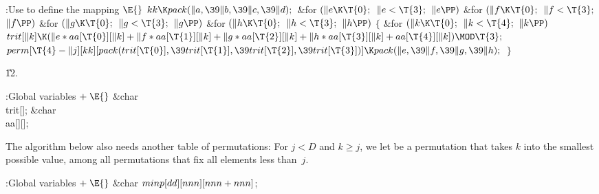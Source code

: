 \B{}:Use  to define the mapping \X${}\E{}$\6
$\\{kk}\K\\{pack}(\|a,\39\|b,\39\|c,\39\|d);{}$\6
\&{for} ${}(\|e\K\T{0};{}$ ${}\|e<\T{3};{}$ ${}\|e\PP){}$\1\6
\&{for} ${}(\|f\K\T{0};{}$ ${}\|f<\T{3};{}$ ${}\|f\PP){}$\1\6
\&{for} ${}(\|g\K\T{0};{}$ ${}\|g<\T{3};{}$ ${}\|g\PP){}$\1\6
\&{for} ${}(\|h\K\T{0};{}$ ${}\|h<\T{3};{}$ ${}\|h\PP){}$\5
${}\{{}$\1\6
\&{for} ${}(\|k\K\T{0};{}$ ${}\|k<\T{4};{}$ ${}\|k\PP){}$\1\5
${}\\{trit}[\|k]\K(\|e*\\{aa}[\T{0}][\|k]+\|f*\\{aa}[\T{1}][\|k]+\|g*\\{aa}[%
\T{2}][\|k]+\|h*\\{aa}[\T{3}][\|k]+\\{aa}[\T{4}][\|k])\MOD\T{3};{}$\2\6
${}\\{perm}[\T{4}-\|j][\\{kk}][\\{pack}(\\{trit}[\T{0}],\39\\{trit}[\T{1}],\39%
\\{trit}[\T{2}],\39\\{trit}[\T{3}])]\K\\{pack}(\|e,\39\|f,\39\|g,\39\|h);{}$\6
\4${}\}{}$\2\2\2\2\par
\U12.\fi

\B{}:Global variables\X${}\mathrel+\E{}$\6
\&{char} \\{trit}[];\6
\&{char} \\{aa}[][];\par
\fi

The algorithm below also needs another table of permutations: For $j<D$
and
$k\ge j$, we let  be a permutation that takes $k$ into
the
smallest possible value, among all permutations that fix all elements
less than~$j$.

\Y\B\4:Global variables\X${}\mathrel+\E{}$\6
\&{char} ${}\\{minp}[\\{dd}][\\{nnn}][\\{nnn}+\\{nnn}]{}$;\par
\fi

